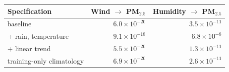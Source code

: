 \begin{tabular}{|l|r|r|}
\hline
\textbf{Specification} & \textbf{Wind $\to$ PM$_{2.5}$} & \textbf{Humidity $\to$ PM$_{2.5}$} \\\hline
baseline & $6.0\times10^{-20}$ & $3.5\times10^{-11}$ \\\hline
+ rain, temperature & $9.1\times10^{-18}$ & $6.8\times10^{-8}$ \\\hline
+ linear trend & $5.5\times10^{-20}$ & $1.3\times10^{-11}$ \\\hline
training-only climatology & $6.9\times10^{-20}$ & $2.6\times10^{-11}$ \\\hline
\end{tabular}

